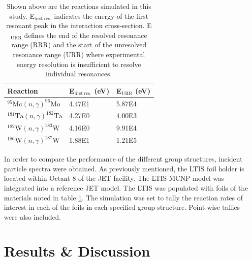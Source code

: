 \begin{table}[H]
  \centering
  \begin{tabular}{lll}
    \toprule
    Reaction                                       & E$_\mathrm{first\ res.}$ (eV) & E$_\mathrm{URR}$ (eV) \\ 
    \midrule
    $^{95}\mathrm{Mo}(n,\gamma)^{96}\mathrm{Mo}$   & 4.47E1                        & 5.87E4                \\
    $^{181}\mathrm{Ta}(n,\gamma)^{182}\mathrm{Ta}$ & 4.27E0                        & 4.00E3                \\
    $^{182}\mathrm{W}(n,\gamma)^{183}\mathrm{W}$   & 4.16E0                        & 9.91E4                \\
    $^{186}\mathrm{W}(n,\gamma)^{187}\mathrm{W}$   & 1.88E1                        & 1.21E5                \\ 
    \bottomrule
  \end{tabular}
  \caption{Shown above are the reactions simulated in this study. E$_\mathrm{first\ res.}$ indicates the energy of the first resonant peak in the interaction cross-section. E$_\mathrm{URR}$ defines the end of the resolved resonance range (RRR) and the start of the unresolved resonance range (URR) where experimental energy resolution is insufficient to resolve individual resonances.}
  \label{tab:reactions}
\end{table}

In order to compare the performance of the different group structures, incident particle spectra were obtained. As previously mentioned, the LTIS foil holder is located within Octant 8 of the JET facility. The LTIS MCNP model \cite{lengar2017} was integrated into a reference JET model. The LTIS was populated with foils of the materials noted in table \ref{tab:reactions}. The simulation was set to tally the reaction rates of interest in each of the foils in each specified group structure. Point-wise tallies were also included.

\section{Results \& Discussion}
\label{sec:results}

